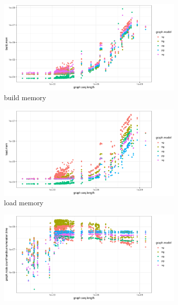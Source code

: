 \documentclass{article}
\begin{document}
\begin{figure}
  \begin{subfigure}[t]{0.5\textwidth}
    \centering
    \includegraphics[width=1.0\textwidth]{figures/build_mem.pdf}
    \caption{build memory}
  \end{subfigure}
  \begin{subfigure}[t]{0.5\textwidth}
    \centering
    \includegraphics[width=1.0\textwidth]{figures/load_mem.pdf}
    \caption{load memory}
  \end{subfigure}
  \begin{subfigure}[t]{0.5\textwidth}
    \centering
    \includegraphics[width=1.0\textwidth]{figures/handle_enumeration_time.pdf}

\end{subfigure}
\end{figure}
\end{document}

